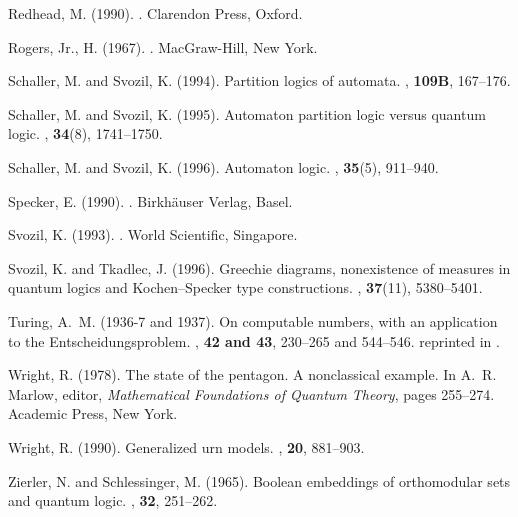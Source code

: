 \begin{thebibliography}{}
Redhead, M. (1990).
.
\newblock Clarendon Press, Oxford.

{Rogers, Jr.}, H. (1967).
.
\newblock MacGraw-Hill, New York.

Schaller, M. and Svozil, K. (1994).
\newblock Partition logics of automata.
, {\bf 109B}, 167--176.

Schaller, M. and Svozil, K. (1995).
\newblock Automaton partition logic versus quantum logic.
, {\bf 34}(8),
  1741--1750.

Schaller, M. and Svozil, K. (1996).
\newblock Automaton logic.
, {\bf 35}(5),
  911--940.

Specker, E. (1990).
.
\newblock Birkh{\"{a}}user Verlag, Basel.

Svozil, K. (1993).
.
\newblock World Scientific, Singapore.

Svozil, K. and Tkadlec, J. (1996).
\newblock Greechie diagrams, nonexistence of measures in quantum logics and
  {K}ochen--{S}pecker type constructions.
, {\bf 37}(11), 5380--5401.

Turing, A.~M. (1936-7 and 1937).
\newblock On computable numbers, with an application to the
  {E}ntscheidungsproblem.
, {\bf
  42 and 43}, 230--265 and 544--546.
\newblock reprinted in \cite{davis}.

Wright, R. (1978).
\newblock The state of the pentagon. {A} nonclassical example.
\newblock In A.~R. Marlow, editor, {\em Mathematical Foundations of Quantum
  Theory}, pages 255--274. Academic Press, New York.

Wright, R. (1990).
\newblock Generalized urn models.
, {\bf 20}, 881--903.

Zierler, N. and Schlessinger, M. (1965).
\newblock Boolean embeddings of orthomodular sets and quantum logic.
, {\bf 32}, 251--262.

\end{thebibliography}


